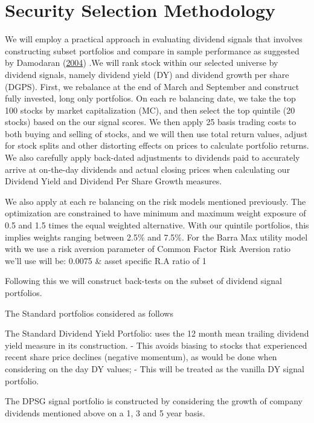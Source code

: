 \documentclass[12pt,preprint, authoryear]{elsarticle}
\numberwithin{equation}{section}
\numberwithin{figure}{section}
\numberwithin{table}{section}
\begin{document}
\hypertarget{security-selection-methodology}{%
\section{Security Selection
Methodology}\label{security-selection-methodology}}

We will employ a practical approach in evaluating dividend signals that
involves constructing subset portfolios and compare in sample
performance as suggested by Damodaran
(\protect\hyperlink{ref-damodaran2004investment}{2004}) .We will rank
stock within our selected universe by dividend signals, namely dividend
yield (DY) and dividend growth per share (DGPS). First, we rebalance at
the end of March and September and construct fully invested, long only
portfolios. On each re balancing date, we take the top 100 stocks by
market capitalization (MC), and then select the top quintile (20 stocks)
based on the our signal scores. We then apply 25 basis trading costs to
both buying and selling of stocks, and we will then use total return
values, adjust for stock splits and other distorting effects on prices
to calculate portfolio returns. We also carefully apply back-dated
adjustments to dividends paid to accurately arrive at on-the-day
dividends and actual closing prices when calculating our Dividend Yield
and Dividend Per Share Growth measures.

We also apply at each re balancing on the risk models mentioned
previously. The optimization are constrained to have minimum and maximum
weight exposure of 0.5 and 1.5 times the equal weighted alternative.
With our quintile portfolios, this implies weights ranging between 2.5\%
and 7.5\%. For the Barra Max utility model with we use a risk aversion
parameter of Common Factor Risk Aversion ratio we'll use will be: 0.0075
\& asset specific R.A ratio of 1

Following this we will construct back-tests on the subset of dividend
signal portfolios.

The Standard portfolios considered as follows

The Standard Dividend Yield Portfolio: uses the 12 month mean trailing
dividend yield measure in its construction. - This avoids biasing to
stocks that experienced recent share price declines (negative momentum),
as would be done when considering on the day DY values; - This will be
treated as the vanilla DY signal portfolio.

The DPSG signal portfolio is constructed by considering the growth of
company dividends mentioned above on a 1, 3 and 5 year basis.
\end{document}

